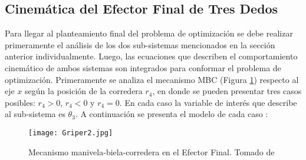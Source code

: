 \subsection{Cinemática del Efector Final de Tres Dedos }

Para llegar al planteamiento final del problema de optimización se debe realizar primeramente el análisis de los dos sub-sistemas mencionados en la sección anterior individualmente. Luego, las ecuaciones que describen el comportamiento cinemático de ambos sistemas son integrados para conformar el problema de optimización. Primeramente se analiza el mecanismo MBC (Figura \ref{fig:Griper_MBC}) respecto al eje $x$ según la posición de la corredera $r_4$, en donde se pueden presentar tres casos posibles: $r_4 > 0$, $r_4 < 0$ y $r_4 = 0$. En cada caso la variable de interés que describe al sub-sistema es $\theta_3$. A continuación se presenta el modelo de cada caso \cite{capistran_2015}:
\begin{figure}[htb]
    \centering
     \texttt{[image: Griper2.jpg]}
    \caption[Mecanismo manivela-biela-corredera en el Efector Final.]{Mecanismo manivela-biela-corredera en el Efector Final. Tomado de \cite{zapata_zapata_control_2017} }
    \label{fig:Griper_MBC}
\end{figure}
